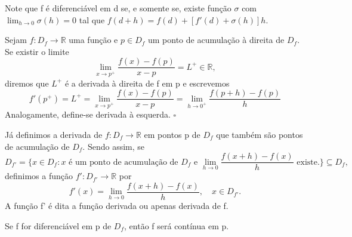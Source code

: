 \documentclass[analysis_notes.tex]{subfiles}
\begin{document}
Note que f é diferenciável em d se, e somente se, existe fun\c cão \(\sigma \)
com \(\lim_{h\to 0}\sigma (h)=0\) tal que \(f(d+h)=f(d)+[f'(d)+\sigma (h)]h\).
\begin{def*}
	Sejam \(f:D_{f}\rightarrow \mathbb{R}\) uma fun\c cão e \(p\in D_{f}\) um ponto
	de acumula\c cão à direita de \(D_{f}\). Se existir o limite
	\[
		\lim_{x\to p^{+}}\frac{f(x)-f(p)}{x-p}=L^+\in \mathbb{R},
	\]
	diremos que \(L^+\) é a derivada à direita de f em p e escrevemos
	\[
		f'(p^+) = L^+=\lim_{x\to p^+}\frac{f(x)-f(p)}{x-p}= \lim_{h\to 0^{+}}\frac{f(p+h)-f(p)}{h}
	\]
	Analogamente, define-se derivada à esquerda. \(\square\)
\end{def*}
Já definimos a derivada de \(f:D_{f}\rightarrow \mathbb{R}\) em pontos p de
\(D_{f}\) que também são pontos de acumula\c cão de \(D_{f}\). Sendo assim,
se
\[
	D_{f'}= \biggl\{x\in D_{f}:x\text{ é um ponto de acumula\c cão de $D_{f}$ e }\lim_{h\to 0}\frac{f(x+h)-f(x)}{h}\text{ existe.}\biggr\}\subseteq{D_{f}},
\]
definimos a fun\c cão \(f':D_{f'}\rightarrow \mathbb{R}\) por
\[
	f'(x) = \lim_{h\to 0}\frac{f(x+h)-f(x)}{h}, \quad x\in D_{f'}.
\]
A fun\c cão f' é dita a fun\c cão derivada ou apenas derivada de f.
\hypertarget{diff_cont}{
	\begin{theorem*}
		Se f for diferenciável em p de \(D_{f}\), então f será contínua em p.
	\end{theorem*}
}
\end{document}
